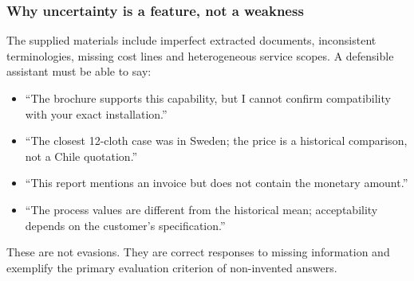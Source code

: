 \documentclass[11pt,a4paper]{article}
\begin{document}
\subsubsection{Why uncertainty is a feature, not a weakness}
The supplied materials include imperfect extracted documents, inconsistent terminologies, missing cost lines and heterogeneous service scopes. A defensible assistant must be able to say:
\begin{itemize}
\item ``The brochure supports this capability, but I cannot confirm compatibility with your exact installation.''
\item ``The closest 12-cloth case was in Sweden; the price is a historical comparison, not a Chile quotation.''
\item ``This report mentions an invoice but does not contain the monetary amount.''
\item ``The process values are different from the historical mean; acceptability depends on the customer's specification.''
\end{itemize}
These are not evasions. They are correct responses to missing information and exemplify the primary evaluation criterion of non-invented answers.
\end{document}
